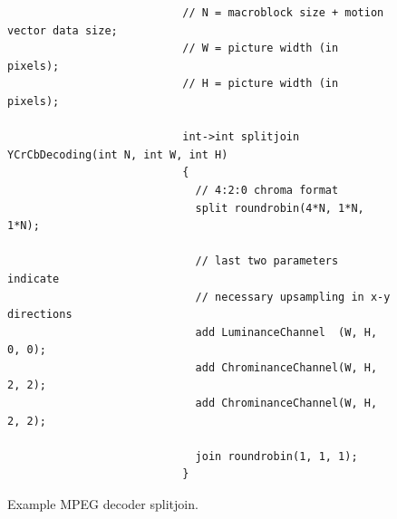 \begin{figure}[t]
  \begin{scriptsize}
    \begin{verbatim}
                           // N = macroblock size + motion vector data size;
                           // W = picture width (in pixels);
                           // H = picture width (in pixels);

                           int->int splitjoin YCrCbDecoding(int N, int W, int H)
                           {
                             // 4:2:0 chroma format
                             split roundrobin(4*N, 1*N, 1*N);

                             // last two parameters indicate
                             // necessary upsampling in x-y directions
                             add LuminanceChannel  (W, H, 0, 0);
                             add ChrominanceChannel(W, H, 2, 2);
                             add ChrominanceChannel(W, H, 2, 2);

                             join roundrobin(1, 1, 1);
                           }              
    \end{verbatim}
  \end{scriptsize}
  \vspace{-12pt}
  \caption{Example MPEG decoder splitjoin.}
  \label{fig:decoder-sj}
\end{figure}

